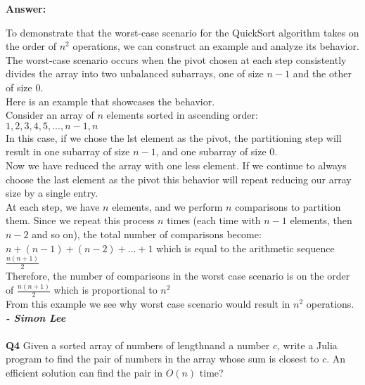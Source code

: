\documentclass{article}
\begin{document}
\textbf{Answer:}

To demonstrate that the worst-case scenario for the QuickSort algorithm takes on the order of \(n^2\) operations, we can construct an example and analyze its behavior. The worst-case scenario occurs when the pivot chosen at each step consistently divides the array into two unbalanced subarrays, one of size 
\(n-1\) and the other of size 0.\\

Here is an example that showcases the behavior. \\ 

Consider an array of $n$ elements sorted in ascending order: \\ 

\(1,2,3,4,5,...,n-1,n\) \\

In this case, if we chose the lst element as the pivot, the partitioning step will result in one subarray of size \(n-1\), and one subarray of size 0. \\

Now we have reduced the array with one less element. If we continue to always choose the last element as the pivot this behavior will repeat reducing our array size by a single entry. \\

At each step, we have $n$ elements, and we perform $n$ comparisons to partition them. Since we repeat this process $n$ times (each time with \(n-1\) elements, then \(n-2\) and so on), the total number of comparisons become: \\ 

\(n + (n-1) + (n-2) + ... + 1 \) which is equal to the arithmetic sequence \(\frac{n(n+1)}{2}\) \\

Therefore, the number of comparisons in the worst case scenario is on the order of \(\frac{n(n+1)}{2}\) which is proportional to $n^2$ \\

From this example we see why worst case scenario would result in $n^2$ operations. \\

\textbf{\textit{- Simon Lee }} \\\\

\textbf{Q4} Given a sorted array of numbers of lengthnand a number $c$, write a Julia program to find the pair of numbers in the array whose sum is closest to $c$. An efficient solution can find the pair in $O(n)$ time?\\
\end{document}
